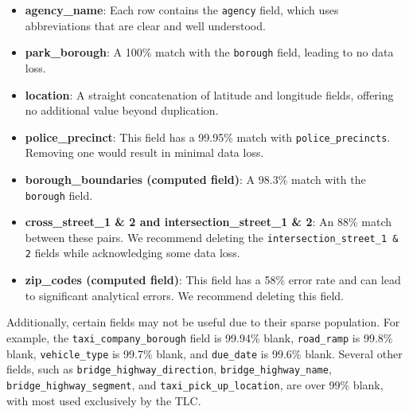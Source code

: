 \documentclass[linenumber]{jdsart}
\begin{document}
\begin{itemize}
    \item \textbf{agency\_name}: Each row contains the \texttt{agency} field, 
    which uses abbreviations that are clear and well understood.
    
    \item \textbf{park\_borough}: A 100\% match with the \texttt{borough} field, 
    leading to no data loss.
    
    \item \textbf{location}: A straight concatenation of latitude and longitude 
    fields, offering no additional value beyond duplication.
    
    \item \textbf{police\_precinct}: This field has a 99.95\% match with 
    \texttt{police\_precincts}. Removing one would result in minimal data loss.
    
    \item \textbf{borough\_boundaries (computed field)}: A 98.3\% match 
    with the \texttt{borough} field.
    
    \item \textbf{cross\_street\_1 \& 2 and intersection\_street\_1 \& 2}: 
    An 88\% match between these pairs. We recommend deleting the 
    \texttt{intersection\_street\_1 \& 2} fields while acknowledging some 
    data loss.
    
  \item \textbf{zip\_codes (computed field)}:
    This field has a 58\% error rate and can lead to significant 
    analytical errors. We recommend deleting this field.
\end{itemize}

Additionally, certain fields may not be useful due to their sparse population. 
For example, the \texttt{taxi\_company\_borough} field is 99.94\% blank, 
\texttt{road\_ramp} is 99.8\% blank, \texttt{vehicle\_type} is 99.7\% blank, 
and \texttt{due\_date} is 99.6\% blank. Several other fields, such as 
\texttt{bridge\_highway\_direction}, \texttt{bridge\_highway\_name}, 
\texttt{bridge\_highway\_segment}, and \texttt{taxi\_pick\_up\_location}, 
are over 99\% blank, with most used exclusively by the TLC.
\end{document}
